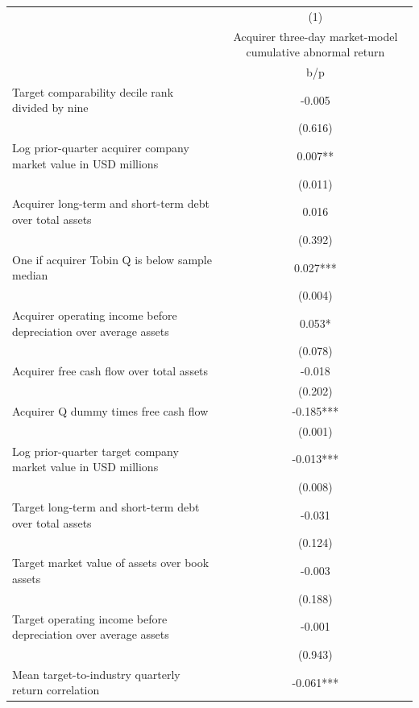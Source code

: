 {
\def\sym#1{\ifmmode^{#1}\else\(^{#1}\)\fi}
\begin{tabular}{l*{1}{c}}
\hline\hline
                    &\multicolumn{1}{c}{(1)}\\
                    &\multicolumn{1}{c}{Acquirer three-day market-model cumulative abnormal return}\\
                    &         b/p   \\
\hline
Target comparability decile rank divided by nine&      -0.005   \\
                    &     (0.616)   \\
Log prior-quarter acquirer company market value in USD millions&       0.007** \\
                    &     (0.011)   \\
Acquirer long-term and short-term debt over total assets&       0.016   \\
                    &     (0.392)   \\
One if acquirer Tobin Q is below sample median&       0.027***\\
                    &     (0.004)   \\
Acquirer operating income before depreciation over average assets&       0.053*  \\
                    &     (0.078)   \\
Acquirer free cash flow over total assets&      -0.018   \\
                    &     (0.202)   \\
Acquirer Q dummy times free cash flow&      -0.185***\\
                    &     (0.001)   \\
Log prior-quarter target company market value in USD millions&      -0.013***\\
                    &     (0.008)   \\
Target long-term and short-term debt over total assets&      -0.031   \\
                    &     (0.124)   \\
Target market value of assets over book assets&      -0.003   \\
                    &     (0.188)   \\
Target operating income before depreciation over average assets&      -0.001   \\
                    &     (0.943)   \\
Mean target-to-industry quarterly return correlation&      -0.061***\\

\end{tabular}}
